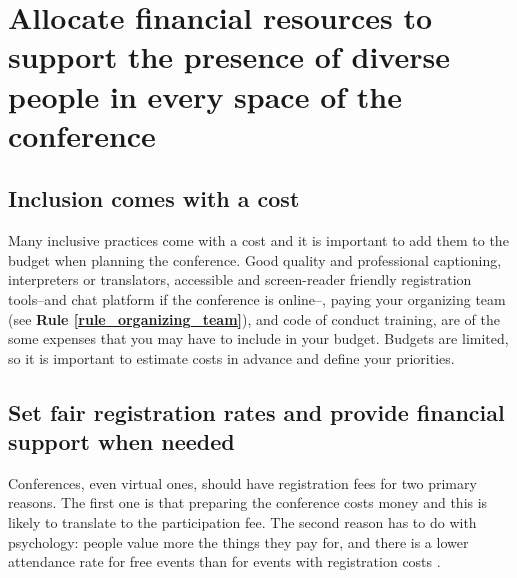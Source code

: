 \documentclass[10pt,letterpaper]{article}
\begin{document}
\section{Allocate financial resources to support the presence of diverse people in every space of the conference
}
\label{rule_financial}


\subsection*{Inclusion comes with a cost}

Many inclusive practices come with a cost and it is important to add them to the budget when planning the conference. 
Good quality and professional captioning, interpreters or translators, accessible and screen-reader friendly registration tools--and chat platform if the conference is online--, paying your organizing team (see \textbf{Rule \ref{rule_organizing_team}}), and code of conduct training, are of the some expenses that you may have to include in your budget. 
Budgets are limited, so it is important to estimate costs in advance and define your priorities.

\subsection*{Set fair registration rates and provide financial support when needed}

Conferences, even virtual ones, should have registration fees for two primary reasons. The first one is that preparing the conference costs money and this is likely to translate to the participation fee. The second reason has to do with psychology: people value more the things they pay for, and there is a lower attendance rate for free events than for events with registration costs \cite{eventbrite_ultimate_2017}. 
\end{document}
